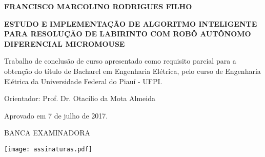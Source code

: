 \begin{center}
\textbf{\Large FRANCISCO MARCOLINO RODRIGUES FILHO}
\par
\vspace{2cm}
\textbf{\Large ESTUDO E IMPLEMENTAÇÃO DE ALGORITMO INTELIGENTE PARA RESOLUÇÃO DE LABIRINTO COM ROBÔ AUTÔNOMO DIFERENCIAL MICROMOUSE}
\end{center}
\par
\vspace{1cm}
\hspace*{160pt}\parbox{9cm}{{Trabalho de conclusão de curso apresentado como requisito parcial para a obtenção do título de Bacharel em Engenharia Elétrica, pelo curso de Engenharia Elétrica da Universidade Federal do Piauí - UFPI.}}
\vspace{1.75cm}
\par\hspace*{160pt}\parbox{10cm}{Orientador: Prof. Dr. Otacílio da Mota Almeida}
\vspace{1cm}
\begin{center}
Aprovado em 7 de julho de 2017.
\vspace{1.5cm}

BANCA EXAMINADORA
\vspace{0.01cm}

\begin{figure*}[!htb]
	\begin{center}
		\texttt{[image: assinaturas.pdf]}
	\end{center}
\end{figure*}
%
%
%

\end{center}
\clearpage

